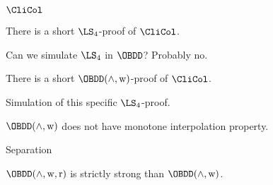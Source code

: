 \begin{frame}{$\CliCol$}

    \begin{theorem}
    	There is a short $\LS_4$-proof of $\CliCol$.
    \end{theorem}

    \pause

    Can we simulate $\LS_4$ in $\OBDD$? Probably no.

    \pause

    \begin{theorem}
        There is a short $\OBDD(\land, \weakening)$-proof of $\CliCol$.
    \end{theorem}

    \pause
    Simulation of this specific $\LS_4$-proof.

    \pause

    \vspace{0.5cm}

    $\OBDD(\land, \weakening)$ does not have monotone interpolation property.

\end{frame}


\begin{frame}{Separation}

    \begin{theorem}
    	$\OBDD(\land, \weakening, \reordering)$ is strictly strong than $\OBDD(\land, \weakening)$.
    \end{theorem}

    \pause


\end{frame}
